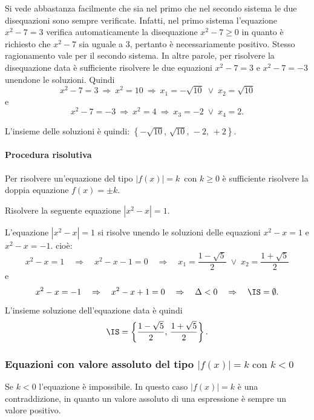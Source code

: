 \begin{exrig}
\begin{esempio}
Si vede abbastanza facilmente che sia nel primo che nel secondo sistema le due disequazioni sono sempre verificate. Infatti, nel primo sistema l'equazione $x^2-7=3$ verifica automaticamente la disequazione $x^2-7\ge 0$ in quanto è richiesto che $x^2-7$ sia uguale a $3$, pertanto è necessariamente positivo.
Stesso ragionamento vale per il secondo sistema. In altre parole, per risolvere la disequazione data è sufficiente risolvere le due equazioni $x^2-7=3$ e $x^2-7=-3$ unendone le soluzioni. Quindi
 \[x^2-7=3\:\Rightarrow\: x^2=10\:\Rightarrow\: x_1=-\sqrt{10}\;\vee\; x_2=\sqrt{10}\]
e \[x^2-7=-3\:\Rightarrow\: x^2=4\:\Rightarrow\: x_3=-2\;\vee\; x_4=2.\]

L'insieme delle soluzioni è quindi: $\left\{-\sqrt{10}\text{, }\sqrt{10}\text{, }-2\text{, }+2\right\}$.
\end{esempio}
\end{exrig}

\paragraph{Procedura risolutiva} Per risolvere un'equazione del tipo $\left|f(x)\right|=k\,\text{ con }k\ge 0$ è sufficiente risolvere la doppia equazione $f(x)=\pm k$.
\begin{exrig}
\begin{esempio}
Risolvere la seguente equazione $\left|x^2-x\right|=1$.

L'equazione $\left|x^2-x\right|=1$ si risolve unendo le soluzioni delle equazioni $x^2-x=1$ e $x^2-x=-1$. cioè:
\[x^2-x=1\quad\Rightarrow\quad x^2-x-1=0\quad\Rightarrow\quad x_1=\frac{1-\sqrt 5} 2\;\vee\; x_2=\frac{1+\sqrt 5} 2\]
e
\[x^2-x=-1\quad\Rightarrow\quad x^2-x+1=0\quad\Rightarrow\quad \Delta <0\quad\Rightarrow\quad\IS=\emptyset.\]

L'insieme soluzione dell'equazione data è quindi \[\IS=\left\{\frac{1-\sqrt 5} 2\text{, }\frac{1+\sqrt 5} 2\right\}.\]
\end{esempio}
\end{exrig}

\subsubsection*{Equazioni con valore assoluto del tipo ${\left|f(x)\right|=k\text{ con }k<0}$}

Se $k<0$ l'equazione è impossibile. In questo caso $\left|f(x)\right|=k$ è una contraddizione, in quanto un valore assoluto di una espressione è sempre un valore positivo.

